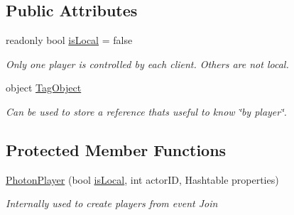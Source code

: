 \subsection*{Public Attributes}
\begin{DoxyCompactItemize}
\item 
readonly bool \hyperlink{class_photon_player_a7d51daf7a538dadae8339e95bf39e692}{is\+Local} = false
\begin{DoxyCompactList}\small\item\em Only one player is controlled by each client. Others are not local.\end{DoxyCompactList}\item 
object \hyperlink{class_photon_player_aaf54b32878a605d3e4d47f16ad106aa3}{Tag\+Object}
\begin{DoxyCompactList}\small\item\em Can be used to store a reference that\textquotesingle{}s useful to know \char`\"{}by player\char`\"{}. \end{DoxyCompactList}\end{DoxyCompactItemize}
\subsection*{Protected Member Functions}
\begin{DoxyCompactItemize}
\item 
\hyperlink{class_photon_player_a741e73c27e9c9f1f4afc9b95481e667d}{Photon\+Player} (bool \hyperlink{class_photon_player_a7d51daf7a538dadae8339e95bf39e692}{is\+Local}, int actor\+ID, Hashtable properties)
\begin{DoxyCompactList}\small\item\em Internally used to create players from event Join \end{DoxyCompactList}\end{DoxyCompactItemize}
